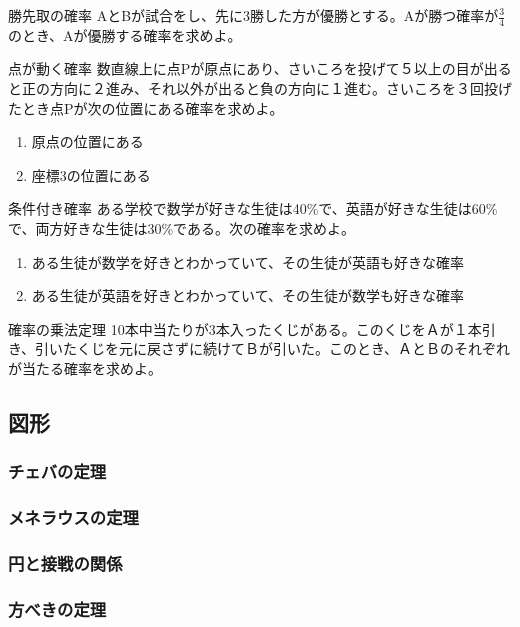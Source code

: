 \documentclass[10pt,dvipdfmx]{jsarticle}
\begin{document}
\begin{itembox}[l]{勝先取の確率}
  AとBが試合をし、先に3勝した方が優勝とする。Aが勝つ確率が$\frac{3}{4}$のとき、Aが優勝する確率を求めよ。
\end{itembox}

\begin{itembox}[l]{点が動く確率}
  数直線上に点Pが原点にあり、さいころを投げて５以上の目が出ると正の方向に２進み、それ以外が出ると負の方向に１進む。さいころを３回投げたとき点Pが次の位置にある確率を求めよ。
  \begin{enumerate}
    \item 原点の位置にある
    \item 座標3の位置にある
  \end{enumerate}
\end{itembox}
\begin{itembox}[l]{条件付き確率}
  ある学校で数学が好きな生徒は40\%で、英語が好きな生徒は60\%で、両方好きな生徒は30\%である。次の確率を求めよ。
  \begin{enumerate}
    \item ある生徒が数学を好きとわかっていて、その生徒が英語も好きな確率
    \item ある生徒が英語を好きとわかっていて、その生徒が数学も好きな確率
  \end{enumerate}
\end{itembox}




\begin{itembox}[l]{確率の乗法定理}
  10本中当たりが3本入ったくじがある。このくじをＡが１本引き、引いたくじを元に戻さずに続けてＢが引いた。このとき、ＡとＢのそれぞれが当たる確率を求めよ。
\end{itembox}

\newpage
\subsection*{図形}
\subsubsection*{チェバの定理}

\subsubsection*{メネラウスの定理}

\subsubsection*{円と接戦の関係}
\subsubsection*{方べきの定理}
\end{document}

